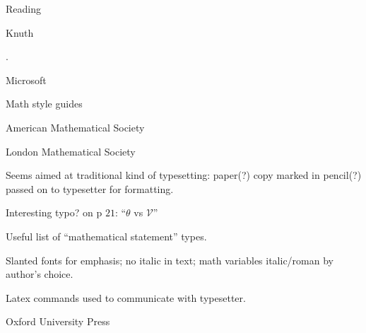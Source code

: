 \documentclass[11pt]{PalisadesLakesBook}
\begin{document}
\begin{plSection}{Reading}
\begin{plSection}{Knuth}



.

\end{plSection}%
\begin{plSection}{Microsoft}


\end{plSection}%
\begin{plSection}{Math style guides}
\begin{plSection}{American Mathematical Society}



\end{plSection}%
\begin{plSection}{London Mathematical Society}


Seems aimed at traditional kind of typesetting:
paper(?) copy marked in pencil(?)  
passed on to typesetter for formatting.

Interesting typo? on p $21$: ``$\theta$ vs $\mathscr{V}$''

Useful list of ``mathematical statement'' types.

Slanted fonts for emphasis; no italic in text;
math variables italic/roman by author's choice.

Latex commands used to communicate with typesetter.


\end{plSection}%
\begin{plSection}{Oxford University Press}



\end{plSection}
\end{plSection}
\end{plSection}
\end{document}
